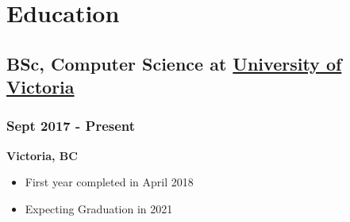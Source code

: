 \documentclass[letterpaper]{article}
\begin{document}
\section{Education}
\label{sec-4}
\subsection{BSc, Computer Science at \href{https://www.uvic.ca/}{University of Victoria}}
\label{sec-4-1}
\subsubsection{Sept 2017 - Present}
\label{sec-4-1-1}
\textbf{Victoria, BC}
\begin{itemize}
\item First year completed in April 2018
\item Expecting Graduation in 2021
\end{itemize}
\end{document}
